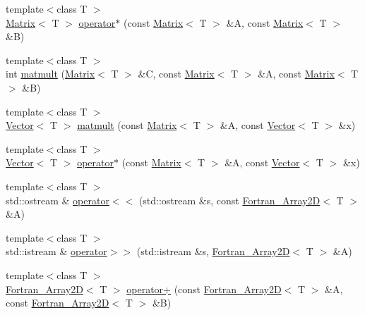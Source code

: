 \begin{DoxyCompactItemize}
\item 
{\footnotesize template$<$class T $>$ }\\\hyperlink{classTNT_1_1Matrix}{Matrix}$<$ T $>$ \hyperlink{namespaceTNT_a3f2fe841addf8cfa323c26ad9d50f010}{operator$\ast$} (const \hyperlink{classTNT_1_1Matrix}{Matrix}$<$ T $>$ \&A, const \hyperlink{classTNT_1_1Matrix}{Matrix}$<$ T $>$ \&B)
\item 
{\footnotesize template$<$class T $>$ }\\int \hyperlink{namespaceTNT_abce6514445cfca8c59b1bec5758c7b08}{matmult} (\hyperlink{classTNT_1_1Matrix}{Matrix}$<$ T $>$ \&C, const \hyperlink{classTNT_1_1Matrix}{Matrix}$<$ T $>$ \&A, const \hyperlink{classTNT_1_1Matrix}{Matrix}$<$ T $>$ \&B)
\item 
{\footnotesize template$<$class T $>$ }\\\hyperlink{classTNT_1_1Vector}{Vector}$<$ T $>$ \hyperlink{namespaceTNT_af5e7c7412c13afcfa68c1b0c71ae1ab6}{matmult} (const \hyperlink{classTNT_1_1Matrix}{Matrix}$<$ T $>$ \&A, const \hyperlink{classTNT_1_1Vector}{Vector}$<$ T $>$ \&x)
\item 
{\footnotesize template$<$class T $>$ }\\\hyperlink{classTNT_1_1Vector}{Vector}$<$ T $>$ \hyperlink{namespaceTNT_aa7eda7fc4788d38da2e89bdd2c77d4bd}{operator$\ast$} (const \hyperlink{classTNT_1_1Matrix}{Matrix}$<$ T $>$ \&A, const \hyperlink{classTNT_1_1Vector}{Vector}$<$ T $>$ \&x)
\item 
{\footnotesize template$<$class T $>$ }\\std\+::ostream \& \hyperlink{namespaceTNT_a4b4db3071f96be25b2b8f58aa642e14b}{operator$<$$<$} (std\+::ostream \&s, const \hyperlink{classTNT_1_1Fortran__Array2D}{Fortran\+\_\+\+Array2D}$<$ T $>$ \&A)
\item 
{\footnotesize template$<$class T $>$ }\\std\+::istream \& \hyperlink{namespaceTNT_a593c4004ec093777d00ecaa7b18ec8ac}{operator$>$$>$} (std\+::istream \&s, \hyperlink{classTNT_1_1Fortran__Array2D}{Fortran\+\_\+\+Array2D}$<$ T $>$ \&A)
\item 
{\footnotesize template$<$class T $>$ }\\\hyperlink{classTNT_1_1Fortran__Array2D}{Fortran\+\_\+\+Array2D}$<$ T $>$ \hyperlink{namespaceTNT_a3838bc6cf71174487152b0bbebf2fa9a}{operator+} (const \hyperlink{classTNT_1_1Fortran__Array2D}{Fortran\+\_\+\+Array2D}$<$ T $>$ \&A, const \hyperlink{classTNT_1_1Fortran__Array2D}{Fortran\+\_\+\+Array2D}$<$ T $>$ \&B)
\item 

\end{DoxyCompactItemize}

